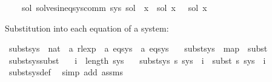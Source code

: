 \begin{isabellebody}
\ \ \ \ {\isacharparenleft}{\kern0pt}{\isasymforall}sol{\isacharprime}{\kern0pt}{\isachardot}{\kern0pt}\ solves{\isacharunderscore}{\kern0pt}ineq{\isacharunderscore}{\kern0pt}sys{\isacharunderscore}{\kern0pt}comm\ sys\ sol{\isacharprime}{\kern0pt}\ {\isasymlongrightarrow}\ {\isacharparenleft}{\kern0pt}{\isasymforall}x{\isachardot}{\kern0pt}\ {\isasymPsi}\ {\isacharparenleft}{\kern0pt}sol\ x{\isacharparenright}{\kern0pt}\ {\isasymsubseteq}\ {\isasymPsi}\ {\isacharparenleft}{\kern0pt}sol{\isacharprime}{\kern0pt}\ x{\isacharparenright}{\kern0pt}{\isacharparenright}{\kern0pt}{\isacharparenright}{\kern0pt}{\isachardoublequoteclose}%
\begin{isamarkuptext}%
Substitution into each equation of a system:%
\end{isamarkuptext}\isamarkuptrue%
\isamarkupfalse%
\ subst{\isacharunderscore}{\kern0pt}sys\ {\isacharcolon}{\kern0pt}{\isacharcolon}{\kern0pt}\ {\isachardoublequoteopen}{\isacharparenleft}{\kern0pt}nat\ {\isasymRightarrow}\ {\isacharprime}{\kern0pt}a\ rlexp{\isacharparenright}{\kern0pt}\ {\isasymRightarrow}\ {\isacharprime}{\kern0pt}a\ eq{\isacharunderscore}{\kern0pt}sys\ {\isasymRightarrow}\ {\isacharprime}{\kern0pt}a\ eq{\isacharunderscore}{\kern0pt}sys{\isachardoublequoteclose}\ \isanewline
\ \ {\isachardoublequoteopen}subst{\isacharunderscore}{\kern0pt}sys\ {\isasymequiv}\ map\ {\isasymcirc}\ subst{\isachardoublequoteclose}\isanewline
\isanewline
{}\isamarkupfalse%
\ subst{\isacharunderscore}{\kern0pt}sys{\isacharunderscore}{\kern0pt}subst{\isacharcolon}{\kern0pt}\isanewline
\ \ \ {\isachardoublequoteopen}i\ {\isacharless}{\kern0pt}\ length\ sys{\isachardoublequoteclose}\isanewline
\ \ \ {\isachardoublequoteopen}{\isacharparenleft}{\kern0pt}subst{\isacharunderscore}{\kern0pt}sys\ s\ sys{\isacharparenright}{\kern0pt}\ {\isacharbang}{\kern0pt}\ i\ {\isacharequal}{\kern0pt}\ subst\ s\ {\isacharparenleft}{\kern0pt}sys\ {\isacharbang}{\kern0pt}\ i{\isacharparenright}{\kern0pt}{\isachardoublequoteclose}\isanewline
%
\isadelimproof
\ \ %
\endisadelimproof
%
\isatagproof
{}\isamarkupfalse%
\ subst{\isacharunderscore}{\kern0pt}sys{\isacharunderscore}{\kern0pt}def\ \isamarkupfalse%
\ {\isacharparenleft}{\kern0pt}simp\ add{\isacharcolon}{\kern0pt}\ assms{\isacharparenright}{\kern0pt}%
\endisatagproof
{\isafoldproof}%
%
\isadelimproof
%
\endisadelimproof
%
\isadelimdocument
%
\endisadelimdocument
%
\isatagdocument
%
\end{isabellebody}
